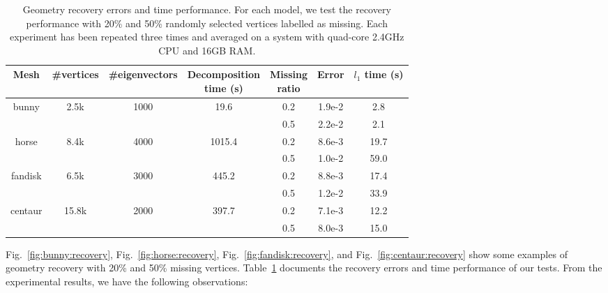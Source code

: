 \begin{table}
\centering
  \begin{tabular}{|c|c|c|c|c|c|c|}
  \hline
  Mesh                     & \#vertices                 & \#eigenvectors          & \pbox{20cm}{Decomposition\\ time (s)} & \pbox{15cm}{Missing\\ ratio} & Error  & $l_1$ time (s) \\
  \hline
  \multirow{2}{3em}{bunny} & \multirow{2}{4em}{2.5k}    & \multirow{2}{5em}{1000} & \multirow{2}{5em}{19.6}   & 0.2          & 1.9e-2 & 2.8       \\
                           &                            &                         &                           & 0.5           & 2.2e-2 & 2.1       \\

  \hline
  \multirow{2}{3em}{horse} & \multirow{2}{4em}{8.4k}    & \multirow{2}{5em}{4000} & \multirow{2}{5em}{1015.4} & 0.2          & 8.6e-3 & 19.7      \\
                           &                            &                         &                           & 0.5           & 1.0e-2 & 59.0      \\
  \hline
  \multirow{2}{3em}{fandisk} & \multirow{2}{4em}{6.5k} & \multirow{2}{5em}{3000} & \multirow{2}{5em}{445.2}   & 0.2          & 8.8e-3 & 17.4      \\
                             &                          &                         &                           & 0.5           & 1.2e-2 & 33.9      \\
  \hline
  \multirow{2}{3em}{centaur} & \multirow{2}{4em}{15.8k} & \multirow{2}{5em}{2000} & \multirow{2}{5em}{397.7}  & 0.2          & 7.1e-3 & 12.2      \\
                             &                          &                         &                           & 0.5           & 8.0e-3 & 15.0      \\
  \hline
  \end{tabular}
\caption[Geometry recovery errors and time performance.]
{Geometry recovery errors and time performance. For each model, we test the recovery performance with
20\% and 50\% randomly selected vertices labelled as missing. Each experiment has been repeated three times
and averaged on a system with quad-core 2.4GHz CPU and 16GB RAM. }
\label{tab:recovery}
\end{table}

Fig.~\ref{fig:bunny:recovery}, Fig.~\ref{fig:horse:recovery}, Fig.~\ref{fig:fandisk:recovery}, and Fig.~\ref{fig:centaur:recovery}
show some examples of geometry recovery with 20\% and 50\%  missing vertices. Table~\ref{tab:recovery} documents
the recovery errors and time performance of our tests. From the experimental results, we have the following
observations:

